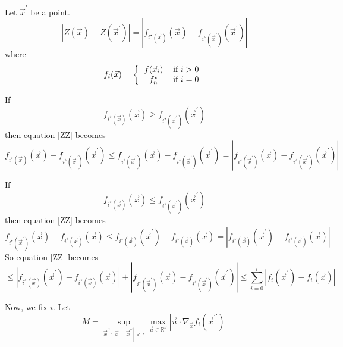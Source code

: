 \documentclass[phd,tocprelim]{cornell}
\begin{document}
Let $\vec{x}^{\prime}$ be a point.
\begin{equation}
    \left|Z(\vec{x}) - Z(\vec{x}^{\prime})\right| = \left|f_{i^{\star}(\vec{x})}(\vec{x}) - f_{i^{\star}(\vec{x}^{\prime})}(\vec{x}^{\prime})\right|
    \label{ZZ}
\end{equation}
where
\begin{equation}
    f_{i}(\vec{x}) = \left\{ \begin{tabular}{cc}
        $f(\vec{x}_{i})$ & if $i > 0$ \\
        $f_{n}^{\star}$ & if $i = 0$
    \end{tabular} \right.
\end{equation}

If
\begin{equation}
    f_{i^{\star}(\vec{x})}(\vec{x}) \geq f_{i^{\star}(\vec{x}^{\prime})}(\vec{x}^{\prime})
\end{equation}
then equation \ref{ZZ} becomes
\begin{equation}
    f_{i^{\star}(\vec{x})}(\vec{x}) - f_{i^{\star}(\vec{x}^{\prime})}(\vec{x}^{\prime}) \leq f_{i^{\star}(\vec{x}^{\prime})}(\vec{x}) - f_{i^{\star}(\vec{x}^{\prime})}(\vec{x}^{\prime}) = \left|f_{i^{\star}(\vec{x}^{\prime})}(\vec{x}) - f_{i^{\star}(\vec{x}^{\prime})}(\vec{x}^{\prime})\right|
\end{equation}

If
\begin{equation}
    f_{i^{\star}(\vec{x})}(\vec{x}) \leq f_{i^{\star}(\vec{x}^{\prime})}(\vec{x}^{\prime})
\end{equation}
then equation \ref{ZZ} becomes
\begin{equation}
    f_{i^{\star}(\vec{x}^{\prime})}(\vec{x}) - f_{i^{\star}(\vec{x})}(\vec{x}) \leq f_{i^{\star}(\vec{x})}(\vec{x}^{\prime}) - f_{i^{\star}(\vec{x})}(\vec{x}) = \left|f_{i^{\star}(\vec{x})}(\vec{x}^{\prime}) - f_{i^{\star}(\vec{x})}(\vec{x})\right|
\end{equation}
So equation \ref{ZZ} becomes
\begin{equation}
    \leq \left|f_{i^{\star}(\vec{x})}(\vec{x}^{\prime}) - f_{i^{\star}(\vec{x})}(\vec{x})\right| + \left|f_{i^{\star}(\vec{x}^{\prime})}(\vec{x}) - f_{i^{\star}(\vec{x}^{\prime})}(\vec{x}^{\prime})\right| \leq \sum_{i=0}^{l} \left|f_{i}(\vec{x}^{\prime}) - f_{i}(\vec{x})\right|
\end{equation}

Now, we fix $i$. Let
\begin{equation}
    M = \sup_{\vec{x}^{\prime\prime}:|\vec{x} - \vec{x}^{\prime\prime}| < \epsilon} \max_{\vec{u} \in \mathbb{R}^{d}} \left|\vec{u} \cdot \nabla_{\vec{x}} f_{i}(\vec{x}^{\prime\prime}) \right|
\end{equation}
\end{document}
